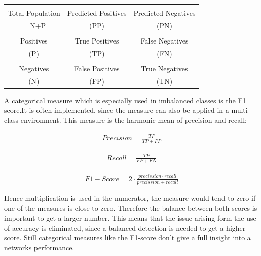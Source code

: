 \documentclass[
a4paper, 
12pt,
grayscalebody, %
abstract=on,
twoside, BCOR10mm, 12pt, DIV13,headinclude, footexclude, final, abstracton, openright
]{ibireprt}
\numberwithin{equation}{chapter}
\numberwithin{table}{chapter}
\numberwithin{figure}{chapter}
\numberwithin{algorithm}{chapter}
\numberwithin{example}{chapter}
\numberwithin{example}{chapter}
\begin{document}
 
\begin{center}
	\begin{tabular}{c||c|c}
	
		& &\\
		Total Population	& Predicted Positives & Predicted Negatives  	\\
		= N+P & (PP) &(PN)\\
		\hline
		\hline
		& &\\
		Positives &  True Positives& False Negatives   \\
		(P)& (TP)&(FN)\\
		\hline
		& &\\
		Negatives & False Positives  & True Negatives  	\\
		(N)&(FP) &(TN)\\
	\end{tabular}
\end{center}

A categorical measure which is especially used in imbalanced classes is the F1 score.It is often implemented, since the measure can also be applied in a multi class environment. This measure is the harmonic mean of precision and recall: %

\begin{align}
 	Precision = \frac{TP}{TP+FP}
\end{align}

\begin{align}
	Recall = \frac{TP}{FP+FN}
\end{align}

\begin{align}
	F1-Score = 2\cdot \frac{precission\cdot recall}{precission+recall}
\end{align}

Hence multiplication is used in the numerator, the measure would tend to zero if one of the measures is close to zero. Therefore the balance between both scores is important to get a larger number. This means that the issue arising form the use of accuracy is eliminated, since a balanced detection is needed to get a higher score. Still categorical measures like the F1-score don't give a full insight into a networks performance.
\end{document}
